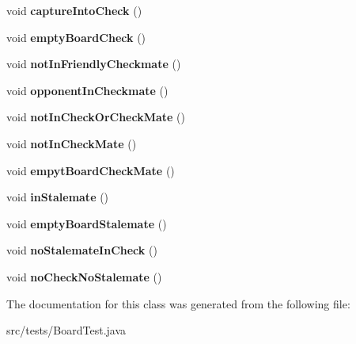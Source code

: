 \begin{DoxyCompactItemize}
\item 
\hypertarget{classtests_1_1_board_test_a1590c4d651a53644965518c73a697fe3}{void {\bfseries capture\-Into\-Check} ()}\label{classtests_1_1_board_test_a1590c4d651a53644965518c73a697fe3}

\item 
\hypertarget{classtests_1_1_board_test_a243ee277c9b08eb5f4b43374b5515675}{void {\bfseries empty\-Board\-Check} ()}\label{classtests_1_1_board_test_a243ee277c9b08eb5f4b43374b5515675}

\item 
\hypertarget{classtests_1_1_board_test_a3faa0906be350af3f3c60539e3a8c128}{void {\bfseries not\-In\-Friendly\-Checkmate} ()}\label{classtests_1_1_board_test_a3faa0906be350af3f3c60539e3a8c128}

\item 
\hypertarget{classtests_1_1_board_test_ac27f1707350258b2f9d1592e207ac06e}{void {\bfseries opponent\-In\-Checkmate} ()}\label{classtests_1_1_board_test_ac27f1707350258b2f9d1592e207ac06e}

\item 
\hypertarget{classtests_1_1_board_test_a5332c3c5c70faefe1931381651585884}{void {\bfseries not\-In\-Check\-Or\-Check\-Mate} ()}\label{classtests_1_1_board_test_a5332c3c5c70faefe1931381651585884}

\item 
\hypertarget{classtests_1_1_board_test_aadd0559f3c497349fa2aeadb36e2d5ae}{void {\bfseries not\-In\-Check\-Mate} ()}\label{classtests_1_1_board_test_aadd0559f3c497349fa2aeadb36e2d5ae}

\item 
\hypertarget{classtests_1_1_board_test_a84fd04ef00dbad620eb25b021bf7644d}{void {\bfseries empyt\-Board\-Check\-Mate} ()}\label{classtests_1_1_board_test_a84fd04ef00dbad620eb25b021bf7644d}

\item 
\hypertarget{classtests_1_1_board_test_a344e6649751aa23e9348e01fa80cdcac}{void {\bfseries in\-Stalemate} ()}\label{classtests_1_1_board_test_a344e6649751aa23e9348e01fa80cdcac}

\item 
\hypertarget{classtests_1_1_board_test_a07d70bc7e1ecec12347be2944af5666d}{void {\bfseries empty\-Board\-Stalemate} ()}\label{classtests_1_1_board_test_a07d70bc7e1ecec12347be2944af5666d}

\item 
\hypertarget{classtests_1_1_board_test_abea75be6399be67b5a408ea67644156e}{void {\bfseries no\-Stalemate\-In\-Check} ()}\label{classtests_1_1_board_test_abea75be6399be67b5a408ea67644156e}

\item 
\hypertarget{classtests_1_1_board_test_acd515721e7858ceccc6a508db6d5667e}{void {\bfseries no\-Check\-No\-Stalemate} ()}\label{classtests_1_1_board_test_acd515721e7858ceccc6a508db6d5667e}

\end{DoxyCompactItemize}


The documentation for this class was generated from the following file\-:\begin{DoxyCompactItemize}
\item 
src/tests/Board\-Test.\-java\end{DoxyCompactItemize}
